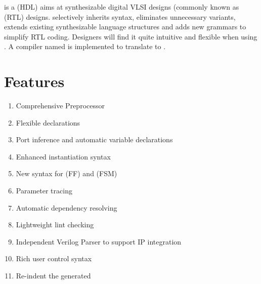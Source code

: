 \mhdl{} is a \hdl{} (HDL) aims at synthesizable digital VLSI designs (commonly 
known as \rtl{} (RTL) designs. \mhdl{} selectively inherits \sv{}
syntax, eliminates unnecessary variants, extends existing
synthesizable language structures and adds new grammars to simplify
RTL coding. Designers will find it quite intuitive and flexible when
using \mhdl{}. A compiler named \mhdlc{}\index{\mhdlc{}} is
implemented to translate \mhdl{} to \sv{}.  

\section{Features}
\begin{enumerate}
\item Comprehensive Preprocessor
\item Flexible declarations
\item Port inference and automatic variable declarations
\item Enhanced instantiation syntax
\item New syntax for \ff{} (FF) and \fsm{} (FSM)
\item Parameter tracing
\item Automatic dependency resolving
\item Lightweight lint checking
\item Independent Verilog Parser to support IP integration
\item Rich user control syntax
\item Re-indent the generated \sv{}
\end{enumerate}

